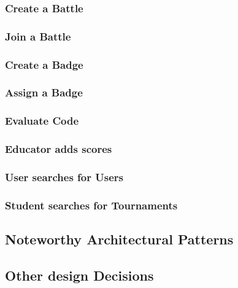 \subsubsection{Create a Battle}
\subsubsection{Join a Battle}
\subsubsection{Create a Badge}
\subsubsection{Assign a Badge}
\subsubsection{Evaluate Code}
\subsubsection{Educator adds scores}
\subsubsection{User searches for Users}
\subsubsection{Student searches for Tournaments}
\subsection{Noteworthy Architectural Patterns}
\subsection{Other design Decisions}